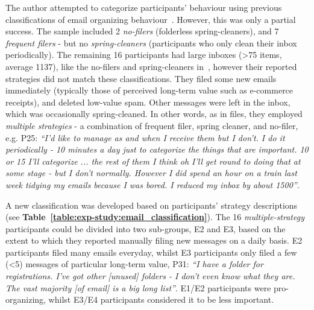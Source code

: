 The author attempted to categorize participants' behaviour using previous classifications of email organizing behaviour~\citep{Whittaker-email:96,ob:97}. However, this was only a partial success. The sample included 2 \textit{no-filers} (folderless spring-cleaners), and 7 \textit{frequent filers} - but no \textit{spring-cleaners} (participants who only clean their inbox periodically).  The remaining 16 participants had large inboxes (>75 items, average 1137), like the no-filers and spring-cleaners in~\citep{Whittaker-email:96}, however their reported strategies did not match these classifications. They filed some new emails immediately (typically those of perceived long-term value such as e-commerce receipts), and deleted low-value spam. Other messages were left in the inbox, which was occasionally spring-cleaned.  In other words, as in files, they employed \textit{multiple strategies} - a combination of frequent filer, spring cleaner, and no-filer, e.g. P25: \textit{``I'd like to manage as and when I receive them but I don't. I do it periodically - 10 minutes a day just to categorize the things that are important. 10 or 15 I'll categorize ... the rest of them I think oh I'll get round to doing that at some stage - but I don't normally. However I did spend an hour on a train last week tidying my emails because I was bored. I reduced my inbox by about 1500''}.

A new classification was developed based on participants' strategy descriptions (see  \textbf{Table~\ref{table:exp-study:email_classification}}). The 16 \textit{multiple-strategy} participants could be divided into two sub-groups, E2 and E3, based on the extent to which they reported manually filing new messages on a daily basis. E2 participants filed many emails everyday, whilst E3 participants only filed a few (<5) messages of particular long-term value, P31: \textit{``I have a folder for registrations. I've got other [unused] folders - I don't even know what they are. The vast majority [of email] is a big long list''}. E1/E2 participants were pro-organizing, whilst E3/E4 participants considered it to be less important.




